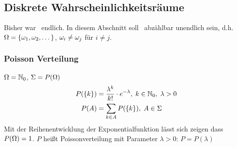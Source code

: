 \subsection{Diskrete Wahrscheinlichkeitsräume}
Bisher war \tO\ endlich. In diesem Abschnitt soll \tO\ abzählbar unendlich sein, d.h.
$\Omega = \{ \omega_1, \omega_2, \dots\}$, $\omega_i \neq \omega_j$ für $i \neq j$.

\subsubsection{Poisson Verteilung}
$\Omega = \mathbb{N}_0$, $\Sigma = P(\Omega)$
\begin{align*}
    P(\{k\}) & = \frac{\lambda^k}{k!} \cdot e^{-\lambda}, \; k \in \mathbb{N}_0, \; \lambda > 0 \\
    P(A)     & = \sum_{k \in A} P(\{k\}), \; A \in \Sigma
\end{align*}
Mit der Reihenentwicklung der Exponentialfunktion lässt sich zeigen dass $P(\Omega) = 1$.
$P$ heißt Poissonverteilung mit Parameter $\lambda > 0$: $P = P(\lambda)$